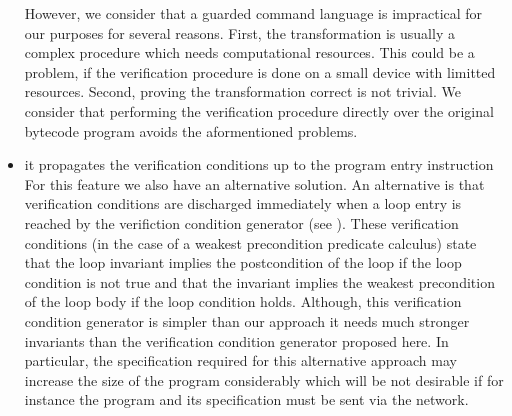 \begin{itemize}
	However, we consider that a guarded command language is impractical for our purposes for
	several reasons.
	First, the transformation is usually a complex procedure which needs
	computational resources. This could be a problem, if the verification procedure is done on a
	small device with limitted resources. Second, proving the transformation correct is not trivial.
	We consider that performing the verification procedure directly over the original bytecode program
	avoids the aformentioned problems.

  
   \item it propagates the verification conditions up to the program entry instruction \\
         For this feature we also have an alternative solution. An alternative is that verification
	 conditions are discharged immediately when a loop entry is reached by the verifiction condition generator (see ).
	 These verification conditions (in the case of a weakest precondition predicate calculus) state that the loop 
	 invariant implies the postcondition of the loop if the loop condition is not true and that the invariant implies the weakest precondition 
	 of the loop body if the loop condition holds. Although, this verification condition generator is simpler than our approach it needs
	 much stronger invariants than the verification condition generator proposed here. In particular, the specification 
	 required for this alternative approach may increase the size of the program considerably which will be not desirable if for instance 
	 the program and its specification must be sent via the network.
\end{itemize}







